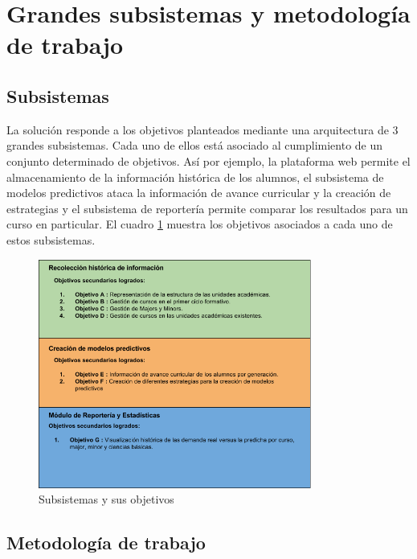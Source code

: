 \section{Grandes subsistemas  y metodología de trabajo \label{sec:sub_systems}}

\subsection{Subsistemas \label{sec:sub_systems_description}}
La solución responde a los objetivos planteados mediante una arquitectura de 3 grandes subsistemas.  Cada uno de ellos está asociado al cumplimiento de un conjunto determinado de objetivos.  Así por ejemplo, la plataforma web permite el almacenamiento de la información histórica de los alumnos,  el subsistema de modelos predictivos ataca la información de avance curricular y la creación de estrategias y el subsistema de reportería permite comparar los resultados para un curso en particular. El cuadro \ref{fig:subsystems} muestra los objetivos asociados a cada uno de estos subsistemas.

\begin{figure}[ht]
	\begin{center}
	  \includegraphics[width=0.8\textwidth]{./figures/chapter_03/01_objetivos.png}
	  \caption{Subsistemas y sus objetivos}
	  \label{fig:subsystems}
	\end{center}
\end{figure}

\subsection{Metodología de trabajo \label{sec:work_methodology}}

